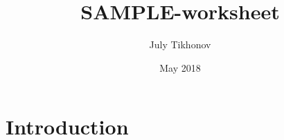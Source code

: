 \documentclass{article}
\title{SAMPLE-worksheet}
\author{July Tikhonov}
\date{May 2018}
\begin{document}
\maketitle

\section{Introduction}
\end{document}
